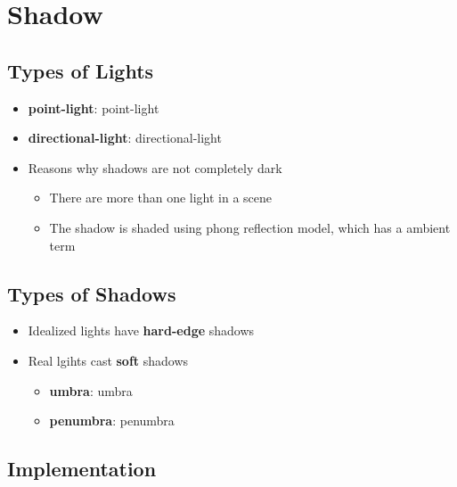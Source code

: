 \chapter{Shadow}

\section{Types of Lights}

  \begin{itemize}
    \item \textbf{\Gls{point-light}}: \glsdesc{point-light}
    \item \textbf{\Gls{directional-light}}: \glsdesc{directional-light}
    \item Reasons why shadows are not completely dark
    \begin{itemize}
      \item There are more than one light in a scene
      \item The shadow is shaded using phong reflection model, which has a
      ambient term
    \end{itemize}
  \end{itemize}

\section{Types of Shadows}

  \begin{itemize}
    \item Idealized lights have \textbf{hard-edge} shadows
    \item Real lgihts cast \textbf{soft} shadows
    \begin{itemize}
      \item \textbf{\Gls{umbra}}: \glsdesc{umbra}
      \item \textbf{\Gls{penumbra}}: \glsdesc{penumbra}
    \end{itemize}
  \end{itemize}

\section{Implementation}

